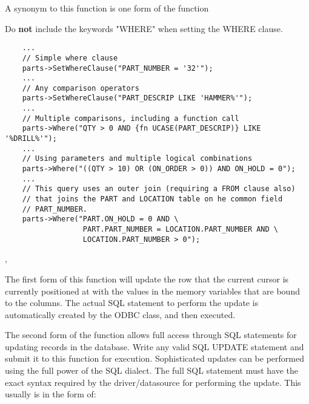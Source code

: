 A synonym to this function is one form of the function 




Do {\bf not} include the keywords "WHERE" when setting the WHERE clause.


\begin{verbatim}
    ...
    // Simple where clause
    parts->SetWhereClause("PART_NUMBER = '32'");
    ...
    // Any comparison operators
    parts->SetWhereClause("PART_DESCRIP LIKE 'HAMMER%'");
    ...
    // Multiple comparisons, including a function call
    parts->Where("QTY > 0 AND {fn UCASE(PART_DESCRIP)} LIKE '%DRILL%'");
    ...
    // Using parameters and multiple logical combinations
    parts->Where("((QTY > 10) OR (ON_ORDER > 0)) AND ON_HOLD = 0");
    ...
    // This query uses an outer join (requiring a FROM clause also)
    // that joins the PART and LOCATION table on he common field
    // PART_NUMBER.
    parts->Where("PART.ON_HOLD = 0 AND \
                  PART.PART_NUMBER = LOCATION.PART_NUMBER AND \
                  LOCATION.PART_NUMBER > 0");
\end{verbatim}


, 


\label{wxdbtableupdate}



The first form of this function will update the row that the current cursor 
is currently positioned at with the values in the memory variables that 
are bound to the columns.  The actual SQL statement to perform the update 
is automatically created by the ODBC class, and then executed.

The second form of the function allows full access through SQL statements for 
updating records in the database.  Write any valid SQL UPDATE statement and 
submit it to this function for execution.  Sophisticated updates can be 
performed using the full power of the SQL dialect. The full SQL statement 
must have  the exact syntax required by the driver/datasource for performing 
the update.  This usually is in the form of:

